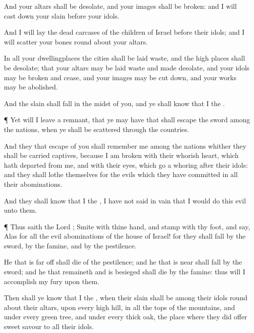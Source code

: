 {And your
altars shall be
desolate, and your
images shall be
broken: and I will cast
down your
slain
{}
before your
idols.

And I will
lay the dead
carcases of the
children of
Israel
before their
idols; and I will
scatter your
bones round
about your
altars.

In all your
dwellingplaces the
cities shall be laid
waste, and the high
places shall be
desolate; that your
altars may be laid
waste and made
desolate, and your
idols may be
broken and
cease, and your
images may be cut
down, and your
works may be
abolished.

And the
slain shall
fall in the
midst of you, and ye shall
know that I
{} the
{}.


\par }{\PP {}¶ Yet will I leave a
remnant, that ye may have
{} that shall
escape the
sword among the
nations, when ye shall be
scattered through the
countries.

And they that
escape of you shall
remember me among the
nations whither they shall be carried
captives, because I am
broken with their
whorish
heart, which hath
departed from me, and with their
eyes, which go a
whoring
after their
idols: and they shall
lothe
themselves for the
evils which they have
committed in all their
abominations.

And they shall
know that I
{} the
{},
{} I have not
said in
vain that I would
do this
evil unto them.


\par }{\PP {}¶ Thus
saith the
Lord
{};
Smite with thine
hand, and
stamp with thy
foot, and
say,
Alas for all the
evil
abominations of the
house of
Israel! for they shall
fall by the
sword, by the
famine, and by the
pestilence.

He that is far
off shall
die of the
pestilence; and he that is
near shall
fall by the
sword; and he that
remaineth and is
besieged shall
die by the
famine: thus will I
accomplish my
fury upon them.

Then shall ye
know that I
{} the
{}, when their
slain
{} shall be
among their
idols round
about their
altars, upon every
high
hill, in all the
tops of the
mountains, and under every
green
tree, and under every
thick
oak, the
place where they did
offer
sweet
savour to all their
idols.

}
